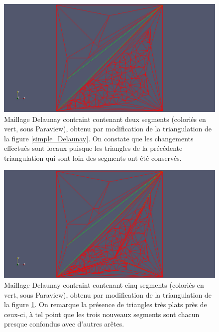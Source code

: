 \documentclass[12pt,a4paper]{report}
\begin{document}
\begin{figure}[t]
\begin{center}
\includegraphics[scale=0.35, viewport=500 0 1680 1129, clip]{two_segments.jpg}
\caption{Maillage Delaunay contraint contenant deux segments (coloriés en vert, sous Paraview), obtenu par modification de la triangulation de la figure \ref{simple_Delaunay}. On constate que les changements effectués sont locaux puisque les triangles de la précédente triangulation qui sont loin des segments ont été conservés.}\label{two_segments}
\end{center}
\end{figure}

\begin{figure}[t]
\begin{center}
\includegraphics[scale=0.35, viewport=500 0 1680 1129, clip]{segments.jpg}
\caption{Maillage Delaunay contraint contenant cinq segments (coloriés en vert, sous Paraview), obtenu par modification de la triangulation de la figure \ref{two_segments}. On remarque la présence de triangles très plats près de ceux-ci, à tel point que les trois nouveaux segments sont chacun presque confondus avec d'autres arêtes.}\label{five_segments}
\end{center}
\end{figure}
\end{document}
